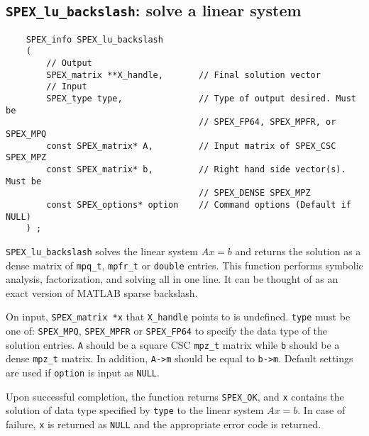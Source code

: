 \documentclass[12pt]{report}
\theoremstyle{definition}
\begin{document}
\subsection{\texttt{SPEX\_lu\_backslash}: solve a linear system}
\label{ss:SPEX_Left_LU_backslash}

\begin{mdframed}[userdefinedwidth=6in]
{\footnotesize
\begin{verbatim}
    SPEX_info SPEX_lu_backslash
    (
        // Output
        SPEX_matrix **X_handle,       // Final solution vector
        // Input
        SPEX_type type,               // Type of output desired. Must be
                                      // SPEX_FP64, SPEX_MPFR, or SPEX_MPQ
        const SPEX_matrix* A,         // Input matrix of SPEX_CSC SPEX_MPZ
        const SPEX_matrix* b,         // Right hand side vector(s). Must be
                                      // SPEX_DENSE SPEX_MPZ 
        const SPEX_options* option    // Command options (Default if NULL)
    ) ;
\end{verbatim}
} \end{mdframed}

\verb|SPEX_lu_backslash| solves the linear system $Ax=b$ and returns the solution
as a dense matrix of \verb|mpq_t|, \verb|mpfr_t| or \verb|double| entries. This
function performs symbolic analysis, factorization, and solving all in one line. 
It can be thought of as an exact version of MATLAB sparse backslash.

On input, \verb|SPEX_matrix *x| that \verb|X_handle| points to is undefined. \verb|type| must be one of:
\verb|SPEX_MPQ|, \verb|SPEX_MPFR| or \verb|SPEX_FP64| to specify the data type
of the solution entries. \verb|A| should be a square CSC \verb|mpz_t| matrix
while \verb|b| should be a dense \verb|mpz_t| matrix. In addition, \verb|A->m|
should be equal to \verb|b->m|.  Default settings are used if
\verb|option| is input as \verb|NULL|.

Upon successful completion, the function returns \verb|SPEX_OK|, and
\verb|x| contains the solution of data type specified by
\verb|type| to the linear system $Ax=b$. In case of failure, \verb|x| is returned as \verb|NULL| and the appropriate error code is returned.
\end{document}
